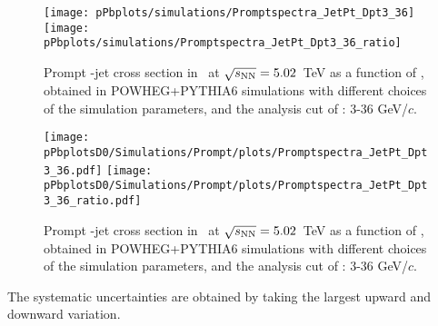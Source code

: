 \begin{figure}[bth]
\begin{center}
\texttt{[image: pPbplots/simulations/Promptspectra\_JetPt\_Dpt3\_36]}
\texttt{[image: pPbplots/simulations/Promptspectra\_JetPt\_Dpt3\_36\_ratio]}
\caption{Prompt \Dstar-jet cross section in \pPb\ at $\sqrt{s_{\rm NN}}=5.02$~TeV as a function of \ptchjet, obtained in POWHEG+PYTHIA6 simulations
with different choices of the simulation parameters, and the analysis cut of \ptd: 3-36 GeV/$c$.} 
\label{fig:PromptDJetsPrediction_JetPtSpectrum_GeneratorLevel}
\end{center}
\end{figure}

\begin{figure}[bth]
\begin{center}
\texttt{[image: pPbplotsD0/Simulations/Prompt/plots/Promptspectra\_JetPt\_Dpt3\_36.pdf]}
\texttt{[image: pPbplotsD0/Simulations/Prompt/plots/Promptspectra\_JetPt\_Dpt3\_36\_ratio.pdf]}
\caption{Prompt \Dzero-jet cross section in \pPb\ at $\sqrt{s_{\rm NN}}=5.02$~TeV as a function of \ptchjet, obtained in POWHEG+PYTHIA6 simulations
with different choices of the simulation parameters, and the analysis cut of \ptd: 3-36 GeV/$c$.} 
\label{fig:PromptD0JetsPrediction_JetPtSpectrum_GeneratorLevel}
\end{center}
\end{figure}


The systematic uncertainties are obtained by taking the largest upward and downward variation.


